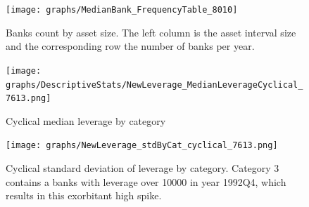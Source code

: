 \documentclass[12pt, a4paper]{article} %
\begin{document}
\begin{figure}[hbtp]
\begin{minipage}{\textwidth}
\centering
\texttt{[image: graphs/MedianBank\_FrequencyTable\_8010]}
\caption[1]{Banks count by asset size. The left column is the asset interval size and the corresponding row the number of banks per year.}
\end{minipage}
\end{figure}

\begin{figure}[H]
\begin{minipage}{\textwidth}
\centering
\texttt{[image: graphs/DescriptiveStats/NewLeverage\_MedianLeverageCyclical\_7613.png]}
\caption[1]{Cyclical median leverage by category}
\label{fig:medianLeverage_cyclical_Categories}
\end{minipage}
\end{figure}

\begin{figure}[hbtp]
\begin{minipage}{\textwidth}
\centering
\texttt{[image: graphs/NewLeverage\_stdByCat\_cyclical\_7613.png]}
\caption[1]{Cyclical standard deviation of leverage by category. Category 3 contains a banks with leverage over 10000 in year 1992Q4, which results in this exorbitant high spike.}
\label{fig:averageLeverage_cyclicalStd_Categories}
\end{minipage}
\end{figure}

\end{document}
